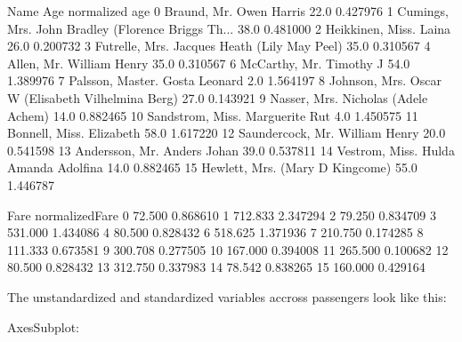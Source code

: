 \documentclass[letterpaper,10pt,english]{jupyterBook}
\begin{document}
\begin{sphinxVerbatim}[commandchars=\\\{\}]
                                                 Name   Age  normalized age  \PYGZbs{}
0                             Braund, Mr. Owen Harris  22.0       \PYGZhy{}0.427976   
1   Cumings, Mrs. John Bradley (Florence Briggs Th...  38.0        0.481000   
2                              Heikkinen, Miss. Laina  26.0       \PYGZhy{}0.200732   
3        Futrelle, Mrs. Jacques Heath (Lily May Peel)  35.0        0.310567   
4                            Allen, Mr. William Henry  35.0        0.310567   
6                             McCarthy, Mr. Timothy J  54.0        1.389976   
7                      Palsson, Master. Gosta Leonard   2.0       \PYGZhy{}1.564197   
8   Johnson, Mrs. Oscar W (Elisabeth Vilhelmina Berg)  27.0       \PYGZhy{}0.143921   
9                 Nasser, Mrs. Nicholas (Adele Achem)  14.0       \PYGZhy{}0.882465   
10                    Sandstrom, Miss. Marguerite Rut   4.0       \PYGZhy{}1.450575   
11                           Bonnell, Miss. Elizabeth  58.0        1.617220   
12                     Saundercock, Mr. William Henry  20.0       \PYGZhy{}0.541598   
13                        Andersson, Mr. Anders Johan  39.0        0.537811   
14               Vestrom, Miss. Hulda Amanda Adolfina  14.0       \PYGZhy{}0.882465   
15                   Hewlett, Mrs. (Mary D Kingcome)   55.0        1.446787   

       Fare  normalized\PYGZus{}Fare  
0    72.500        \PYGZhy{}0.868610  
1   712.833         2.347294  
2    79.250        \PYGZhy{}0.834709  
3   531.000         1.434086  
4    80.500        \PYGZhy{}0.828432  
6   518.625         1.371936  
7   210.750        \PYGZhy{}0.174285  
8   111.333        \PYGZhy{}0.673581  
9   300.708         0.277505  
10  167.000        \PYGZhy{}0.394008  
11  265.500         0.100682  
12   80.500        \PYGZhy{}0.828432  
13  312.750         0.337983  
14   78.542        \PYGZhy{}0.838265  
15  160.000        \PYGZhy{}0.429164  
\end{sphinxVerbatim}

\sphinxAtStartPar
The un\sphinxhyphen{}standardized and standardized variables accross passengers look like this:

\begin{sphinxVerbatim}[commandchars=\\\{\}]
\PYGZlt{}AxesSubplot:\PYGZgt{}
\end{sphinxVerbatim}

\noindent{}
\end{document}
